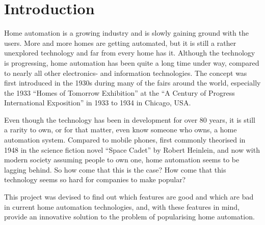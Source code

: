 \chapter{Introduction}\label{part:introduction}

Home automation is a growing industry and is slowly gaining ground with the users. More and more homes are getting automated, but it is still a rather unexplored technology and far from every home has it. Although the technology is progressing, home automation has been quite a long time under way, compared to nearly all other electronics- and information technologies. The concept was first introduced in the 1930s during many of the fairs around the world, especially the 1933 \enquote{Homes of Tomorrow Exhibition} at the \enquote{A Century of Progress International Exposition} in 1933 to 1934 in Chicago, USA.

Even though the technology has been in development for over 80 years, it is still a rarity to own, or for that matter, even know someone who owns, a home automation system. Compared to mobile phones, first commonly theorised in 1948 in the science fiction novel \enquote{Space Cadet} by Robert Heinlein, and now with modern society assuming people to own one, home automation seems to be lagging behind. So how come that this is the case? How come that this technology seems so hard for companies to make popular?

This project was devised to find out which features are good and which are bad in current home automation technologies, and, with these features in mind, provide an innovative solution to the problem of popularising home automation.

